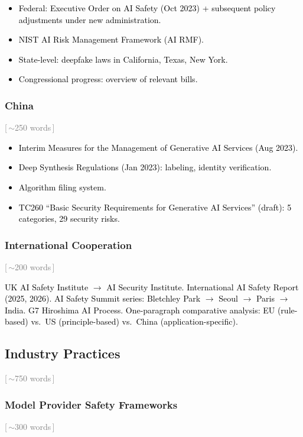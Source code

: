\documentclass[preprint,12pt]{elsarticle}
\newcommand{\wordcount}[1]{\hfill\textcolor{gray}{\small[\,#1\,]}}
\newcommand{\outline}[1]{\textcolor{black}{#1}}
\begin{document}
\outline{%
\begin{itemize}[nosep,leftmargin=1.5em]
    \item Federal: Executive Order on AI Safety (Oct 2023) + subsequent policy adjustments under new administration.
    \item NIST AI Risk Management Framework (AI RMF).
    \item State-level: deepfake laws in California, Texas, New York.
    \item Congressional progress: overview of relevant bills.
\end{itemize}
}

\subsubsection{China} \wordcount{$\sim$250 words}

\outline{%
\begin{itemize}[nosep,leftmargin=1.5em]
    \item Interim Measures for the Management of Generative AI Services (Aug 2023).
    \item Deep Synthesis Regulations (Jan 2023): labeling, identity verification.
    \item Algorithm filing system.
    \item TC260 ``Basic Security Requirements for Generative AI Services'' (draft): 5 categories, 29 security risks.
\end{itemize}
}

\subsubsection{International Cooperation} \wordcount{$\sim$200 words}

\outline{%
UK AI Safety Institute $\to$ AI Security Institute. International AI Safety Report (2025, 2026). AI Safety Summit series: Bletchley Park $\to$ Seoul $\to$ Paris $\to$ India. G7 Hiroshima AI Process. One-paragraph comparative analysis: EU (rule-based) vs.\ US (principle-based) vs.\ China (application-specific).
}


\subsection{Industry Practices} \wordcount{$\sim$750 words}
\label{sec:gov-industry}

\subsubsection{Model Provider Safety Frameworks} \wordcount{$\sim$300 words}
\end{document}
